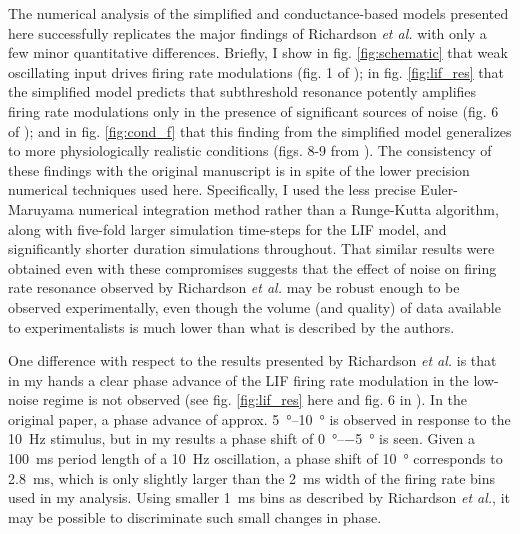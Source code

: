 \documentclass[12pt]{article}
\begin{document}
The numerical analysis of the simplified and conductance-based models presented here successfully replicates the major findings of Richardson \textit{et al.} with only a few minor quantitative differences.
Briefly, I show in fig. \ref{fig:schematic} that weak oscillating input drives firing rate modulations (fig. 1 of \cite{richardson_subthreshold_2003});
in fig. \ref{fig:lif_res} that the simplified model predicts that subthreshold resonance potently amplifies firing rate modulations only in the presence of significant sources of noise (fig. 6 of \cite{richardson_subthreshold_2003});
and in fig. \ref{fig:cond_f} that this finding from the simplified model generalizes to more physiologically realistic conditions (figs. 8-9 from \cite{richardson_subthreshold_2003}).
The consistency of these findings with the original manuscript is in spite of the lower precision numerical techniques used here.
Specifically, I used the less precise Euler-Maruyama numerical integration method rather than a Runge-Kutta algorithm, along with five-fold larger simulation time-steps for the LIF model, and significantly shorter duration simulations throughout.
That similar results were obtained even with these compromises suggests that the effect of noise on firing rate resonance observed by Richardson \textit{et al.} may be robust enough to be observed experimentally, even though the volume (and quality) of data available to experimentalists is much lower than what is described by the authors.

One difference with respect to the results presented by Richardson \textit{et al.} is that in my hands a clear phase advance of the LIF firing rate modulation in the low-noise regime is not observed (see fig. \ref{fig:lif_res} here and fig. 6 in \cite{richardson_subthreshold_2003}).
In the original paper, a phase advance of approx. \SI{5}{\degree}--\SI{10}{\degree} is observed in response to the \SI{10}{\Hz} stimulus, but in my results a phase shift of \SI{0}{\degree}--\SI{-5}{\degree} is seen.
Given a \SI{100}{\ms} period length of a \SI{10}{\Hz} oscillation, a phase shift of \SI{10}{\degree} corresponds to \SI{2.8}{\ms}, which is only slightly larger than the \SI{2}{\ms} width of the firing rate bins used in my analysis.
Using smaller \SI{1}{\ms} bins as described by Richardson \textit{et al.}, it may be possible to discriminate such small changes in phase.
\end{document}
